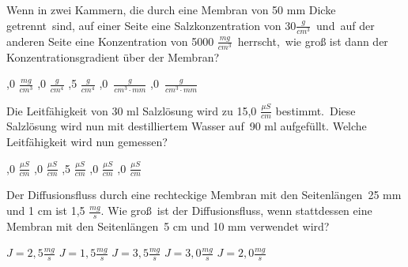 \documentclass[11pt]{exam}
\begin{document}
\setlength{\voffset}{-0.5in}
\setlength{\headsep}{5pt}

\hspace{2mm}
 \hspace{5mm}
\vspace{4mm}

\begin{questions}

\question Wenn in zwei Kammern, die durch eine Membran von 50 mm Dicke getrennt sind, auf einer Seite eine Salzkonzentration von 30\( \frac{g}{cm^3} \) und auf der anderen Seite eine Konzentration von 5000 \( \frac{mg}{cm^3} \) herrscht, wie groß ist dann der Konzentrationsgradient über der Membran?

\begin{choices}
	,0 \( \frac{mg}{cm^3} \)
	,0 \( \frac{g}{cm^4} \)
	,5 \( \frac{g}{cm^4} \)
	,0 \( \frac{g}{cm^3\cdot mm} \)
	,0 \( \frac{g}{cm^3\cdot mm} \)
\end{choices}

\vspace{3mm}\question Die Leitfähigkeit von 30 ml Salzlösung wird zu 15,0 \( \frac{\mu S}{cm} \) bestimmt. Diese Salzlösung wird nun mit destilliertem Wasser auf 90 ml aufgefüllt. Welche Leitfähigkeit wird nun gemessen?

\begin{choices}
	,0 \( \frac{\mu S}{cm} \)
	,0 \( \frac{\mu S}{cm} \)
	,5 \( \frac{\mu S}{cm} \)
	,0 \( \frac{\mu S}{cm} \)
	,0 \( \frac{\mu S}{cm} \)
\end{choices}

\vspace{3mm}\question Der Diffusionsfluss durch eine rechteckige Membran mit den Seitenlängen 25 mm und 1 cm ist 1,5 \(\frac{mg}{s} \). Wie groß ist der Diffusionsfluss, wenn stattdessen eine Membran mit den Seitenlängen 5 cm und 10 mm verwendet wird?

\begin{choices}
	\choice \( J = 2,5 \frac{mg}{s} \)
	\choice \( J = 1,5 \frac{mg}{s} \)
	\choice \( J = 3,5 \frac{mg}{s} \)
	\choice \( J = 3,0 \frac{mg}{s} \)
	\choice \( J = 2,0 \frac{mg}{s} \)
\end{choices}


\end{questions}
\end{document}
